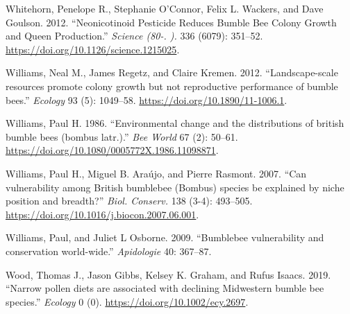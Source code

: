 \documentclass[11pt,]{article}
\begin{document}
\leavevmode\hypertarget{ref-Whitehorn2012}{}%
Whitehorn, Penelope R., Stephanie O'Connor, Felix L. Wackers, and Dave
Goulson. 2012. ``Neonicotinoid Pesticide Reduces Bumble Bee Colony
Growth and Queen Production.'' \emph{Science (80-. ).} 336 (6079):
351--52. \url{https://doi.org/10.1126/science.1215025}.

\leavevmode\hypertarget{ref-Williams2012b}{}%
Williams, Neal M., James Regetz, and Claire Kremen. 2012.
``Landscape-scale resources promote colony growth but not reproductive
performance of bumble bees.'' \emph{Ecology} 93 (5): 1049--58.
\url{https://doi.org/10.1890/11-1006.1}.

\leavevmode\hypertarget{ref-Williams1986}{}%
Williams, Paul H. 1986. ``Environmental change and the distributions of
british bumble bees (bombus latr.).'' \emph{Bee World} 67 (2): 50--61.
\url{https://doi.org/10.1080/0005772X.1986.11098871}.

\leavevmode\hypertarget{ref-Williams2007}{}%
Williams, Paul H., Miguel B. Araújo, and Pierre Rasmont. 2007. ``Can
vulnerability among British bumblebee (Bombus) species be explained by
niche position and breadth?'' \emph{Biol. Conserv.} 138 (3-4): 493--505.
\url{https://doi.org/10.1016/j.biocon.2007.06.001}.

\leavevmode\hypertarget{ref-Williams2009}{}%
Williams, Paul, and Juliet L Osborne. 2009. ``Bumblebee vulnerability
and conservation world-wide.'' \emph{Apidologie} 40: 367--87.

\leavevmode\hypertarget{ref-Wood2019}{}%
Wood, Thomas J., Jason Gibbs, Kelsey K. Graham, and Rufus Isaacs. 2019.
``Narrow pollen diets are associated with declining Midwestern bumble
bee species.'' \emph{Ecology} 0 (0).
\url{https://doi.org/10.1002/ecy.2697}.
\end{document}
